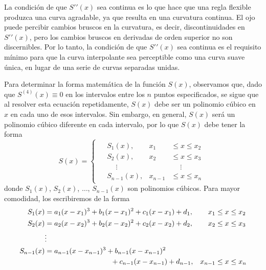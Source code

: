 La condición de que $S′′(x)$ sea continua es lo que hace que una regla flexible produzca una curva agradable, ya que resulta en una curvatura continua. El ojo puede percibir cambios bruscos en la curvatura, es decir, discontinuidades en $S′′(x)$, pero los cambios bruscos en derivadas de orden superior no son discernibles. Por lo tanto, la condición de que $S′′(x)$ sea continua es el requisito mínimo para que la curva interpolante sea perceptible como una curva suave única, en lugar de una serie de curvas separadas unidas.

Para determinar la forma matemática de la función $S(x)$, observamos que, dado que $S^{(4)}(x) \equiv 0$ en los intervalos entre los $n$ puntos especificados, se sigue que al resolver esta ecuación repetidamente, $S(x)$ debe ser un polinomio cúbico en $x$ en cada uno de esos intervalos. Sin embargo, en general, $S(x)$ será un polinomio cúbico diferente en cada intervalo, por lo que $S(x)$ debe tener la forma
\begin{equation}
    S(x) = \begin{cases}
        \begin{aligned}
            & S_1(x), & x_1 & \leq x \leq x_2 \\
            & S_2(x), & x_2 & \leq x \leq x_3 \\
            & \phantom{SS} \vdots & & \;\quad \vdots \\
            & S_{n-1}(x), & x_{n-1} & \leq x \leq x_n
        \end{aligned}
    \end{cases} \label{eq:S_interpola}
\end{equation}
donde $S_1(x)$, $S_2(x)$, $\dots$, $S_{n-1}(x)$ son polinomios cúbicos. Para mayor comodidad, los escribiremos de la forma
\begin{equation}
    \begin{aligned}
        S_1(x) & = a_1(x - x_1)^3 + b_1(x - x_1)^2 + c_1(x - x_1) + d_1, & x_1 & \leq x \leq x_2 \\
        S_2(x) & = a_2(x - x_2)^3 + b_2(x - x_2)^2 + c_2(x - x_2) + d_2, & x_2 & \leq x \leq x_3 \\
        & \vdots & & \\
        S_{n-1}(x) & = a_{n-1}(x - x_{n-1})^3 + b_{n-1}(x - x_{n-1})^2 & & \\
        & \hspace{3.25cm} + c_{n-1}(x - x_{n-1}) + d_{n-1}, & x_{n-1} & \leq x \leq x_n
    \end{aligned} \label{eq:S_interpola1}
\end{equation}

